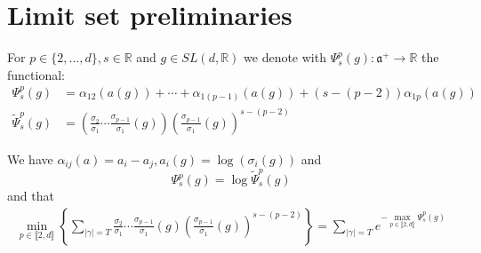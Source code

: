 \documentclass{report}
\begin{document}
\section{Limit set preliminaries}
\begin{definition}
For $p \in \{2, \ldots, d\}, s\in \mathbb R $
and $g \in SL(d, \mathbb R)$ 
we denote with $\Psi_s^p(g): \mathfrak a ^+ \to \mathbb R$ the functional:
\begin{align*}
\Psi_s^p(g) &= 
    \alpha_{12}(a(g)) + \cdots + \alpha_{1(p-1)}(a(g)) + (s - (p-2))\alpha_{1p}(a(g))\\
\tilde \Psi_s^p(g) &= 
    \left( \frac{\sigma_2}{\sigma_1}\cdots\frac{\sigma_{p-1}}{\sigma_1}(g)\right) 
    \left( \frac{\sigma_{p-1}}{\sigma_1}(g) \right)^{s - (p-2)}
\end{align*}
\end{definition}
\begin{remark}
    We have $\alpha_{ij}(a) = a_i - a_j, a_i(g) = \log (\sigma_i(g))$ and 
    \[
        \Psi_s^p(g) = \log \tilde \Psi_s^p(g)
    \]
and that
\begin{align*}
    \min_{p \in \llbracket 2, d \rrbracket} 
    \left\{ 
        \sum_{|\gamma| = T} 
            \frac{\sigma_2}{\sigma_1}\cdots\frac{\sigma_{p-1}}{\sigma_1}(g) 
            \left( \frac{\sigma_{p-1}}{\sigma_1}(g) \right)^{s - (p-2)}
    \right\} = 
    \sum_{|\gamma| = T} e^{-\max\limits_{p \in \llbracket 2, d \rrbracket} \Psi_s^p(g)}
\end{align*}
\end{remark}
\end{document}
